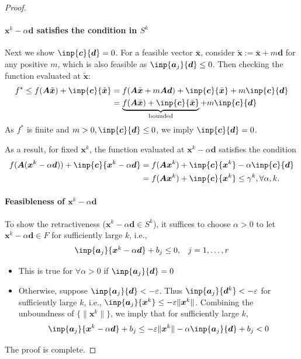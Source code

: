 \begin{enumerate}
\begin{proof}
\paragraph{$\bm x^k-\alpha\bm d$ satisfies the condition in $S^k$} Next we show $\inp{\bm c}{\bm d}=0$. For a feasible vector $\bar{\bm x}$, consider $\tilde{\bm x}:=\bar{\bm x}+m\bm d$ for any positive $m$, which is also feasible as $\inp{\bm a_j}{\bm d}\le0$. Then checking the function evaluated at $\tilde{\bm x}$:
\begin{align*}
f^*\le f(\bm A\tilde{\bm x})+\inp{\bm c}{\tilde{\bm x}}&=
f(\bm A\bar{\bm x}+m\bm A\bm d)+\inp{\bm c}{\bar{\bm x}}+m\inp{\bm c}{\bm d}\\
&=\underbrace{f(\bm A\bar{\bm x})+\inp{\bm c}{\bar{\bm x}}}_{\text{bounded}}+m\inp{\bm c}{\bm d}
\end{align*}
As $f^*$ is finite and $m>0,\inp{\bm c}{\bm d}\le0$,  we imply $\inp{\bm c}{\bm d}=0$.

As a result, for fixed $\bm x^k$, the function evaluated at $\bm x^k-\alpha\bm d$ satisfies the condition
\begin{align*}
f(\bm A(\bm x^k-\alpha\bm d))+\inp{\bm c}{\bm x^k-\alpha\bm d}
&=
f(\bm A\bm x^k)+\inp{\bm c}{\bm x^k}-\alpha\inp{\bm c}{\bm d}
\\&=
f(\bm A\bm x^k)+\inp{\bm c}{\bm x^k}\le\gamma^k,\forall \alpha,k.
\end{align*}
\paragraph{Feasibleness of $\bm x^k-\alpha\bm d$}
To show the retractiveness ($\bm x^k-\alpha\bm d\in S^k$), it suffices to choose $\alpha>0$ to let $\bm x^k-\alpha\bm d\in F$ for sufficiently large $k$, i.e., 
\[
\begin{array}{ll}
\inp{\bm a_j}{\bm x^k-\alpha\bm d}+b_j\le0,
&
j=1,\dots,r
\end{array}
\]
\begin{itemize}
\item
This is true for $\forall\alpha>0$ if $\inp{\bm a_j}{\bm d}=0$
\item
Otherwise, suppose $\inp{\bm a_j}{\bm d}<-\varepsilon$. Thus $\inp{\bm a_j}{\bm d^k}<-\varepsilon$ for sufficiently large $k$, i.e., $\inp{\bm a_j}{\bm x^k}\le-\varepsilon\|\bm x^k\|$. Combining the unboundness of $\{\|\bm x^k\|\}$, we imply that for sufficiently large $k$,
\[
\inp{\bm a_j}{\bm x^k-\alpha\bm d}+b_j\le-\varepsilon\|\bm x^k\|-\alpha\inp{\bm a_j}{\bm d}+b_j<0
\]
\end{itemize}
The proof is complete.
\end{proof}
\end{enumerate}

